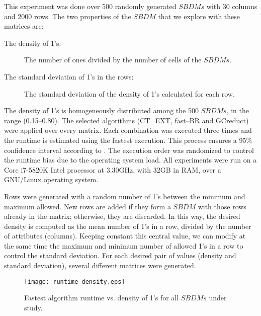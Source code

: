 \documentclass[authoryear,preprint,review,12pt]{elsarticle}
\begin{document}
	This experiment was done over 500 randomly generated $SBDMs$ with 30 columns and 2000 rows. The two properties of the $SBDM$ that we explore with these matrices are:
	\begin{description}
		\item[The density of 1's:] The number of ones divided by the number of cells of the $SBDMs$.
		\item[The standard deviation of 1's in the rows:] The standard deviation of the density of 1's calculated for each row.
	\end{description}
	The density of 1's is homogeneously distributed among the 500 $SBDMs$, in the range (0.15--0.80). The selected algorithms (CT\_EXT, fast--BR and GCreduct) were applied over every matrix. Each combination was executed three times and the runtime is estimated using the fastest execution. This process ensures a 95\% confidence interval according to \cite{Haveraaen01}. The execution order was randomized to control the runtime bias due to the operating system load. All experiments were run on a Core i7-5820K Intel processor at 3.30GHz, with 32GB in RAM, over a GNU/Linux operating system.
	
	Rows were generated with a random number of 1's between the minimum and maximum allowed. New rows are added if they form a $SBDM$ with those rows already in the matrix; otherwise, they are discarded. In this way, the desired density is computed as the mean number of 1's in a row, divided by the number of attributes (columns). Keeping constant this central value, we can modify at the same time the maximum and minimum number of	allowed 1's in a row to control the standard deviation. For each desired pair of values (density and standard deviation), several different matrices were generated. 
			
	\begin{figure}[htb]
		\begin{center}
			\texttt{[image: runtime\_density.eps]}
		\end{center}
		\caption{Fastest algorithm runtime vs. density of 1's for all $SBDMs$ under study.}
		\label{fig:scattDensity}
	\end{figure}	
\end{document}
